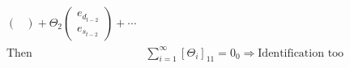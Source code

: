 \begin{itemize}
\begin{itemize}
\begin{itemize}
\begin{align*}
\begin{pmatrix}
                \end{pmatrix} + \Theta_2 \begin{pmatrix}
                    e_{d_{t-2}}\\
                    e_{s_{t-2}}
                \end{pmatrix} + \cdots \\
                \text{Then } &\sum_{i=1}^\infty \left[ \Theta_i \right]_{11} = 0_0 \Rightarrow \text{Identification too}
            \end{align*}
        \end{itemize}
    \end{itemize}
\end{itemize}


